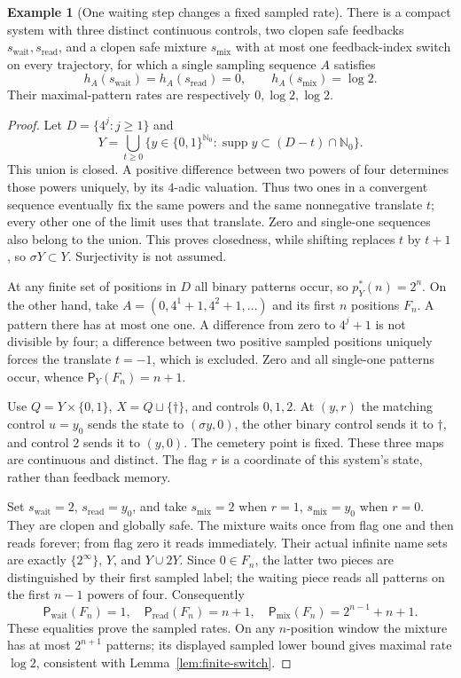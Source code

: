 \documentclass[11pt,reqno]{amsart}
\numberwithin{equation}{section}
\theoremstyle{definition}
\newtheorem{example}[theorem]{Example}
\theoremstyle{definition}
\newcommand{\Nzero}{\mathbb N_0}
\newcommand{\Patt}{\mathsf P}
\newcommand{\supp}{\operatorname{supp}}
\begin{document}
\begin{example}[One waiting step changes a fixed sampled rate]
\label{ex:one-wait}
There is a compact system with three distinct continuous controls,
two clopen safe feedbacks $s_{\mathrm{wait}},s_{\mathrm{read}}$, and a
clopen safe mixture $s_{\mathrm{mix}}$ with at most one feedback-index
switch on every trajectory, for which a single sampling sequence
$A$ satisfies
\[
 h_A(s_{\mathrm{wait}})=h_A(s_{\mathrm{read}})=0,
 \qquad h_A(s_{\mathrm{mix}})=\log2.
\]
Their maximal-pattern rates are respectively $0,\log2,\log2$.
\end{example}
\begin{proof}
Let $D=\{4^j:j\ge1\}$ and
\[
 Y=\bigcup_{t\ge0}
 \{y\in\{0,1\}^{\Nzero}:\supp y\subset(D-t)\cap\Nzero\}.
\]
This union is closed. A positive difference between two powers
of four determines those powers uniquely, by its $4$-adic
valuation. Thus two ones in a convergent sequence eventually
fix the same powers and the same nonnegative translate $t$;
every other one of the limit uses that translate. Zero and
single-one sequences also belong to the union. This proves
closedness, while shifting replaces $t$ by $t+1$, so
$\sigma Y\subset Y$. Surjectivity is not assumed.

At any finite set of positions in $D$ all binary patterns occur,
so $p_Y^*(n)=2^n$. On the other hand, take
$A=(0,4^1+1,4^2+1,\ldots)$ and its first $n$ positions $F_n$.
A pattern there has at most one one. A difference from zero
to $4^j+1$ is not divisible by four; a difference between two
positive sampled positions uniquely forces the translate
$t=-1$, which is excluded. Zero and all single-one patterns
occur, whence $\Patt_Y(F_n)=n+1$.

Use $Q=Y\times\{0,1\}$, $X=Q\sqcup\{\dagger\}$, and
controls $0,1,2$. At $(y,r)$ the matching control $u=y_0$
sends the state to $(\sigma y,0)$, the other binary control
sends it to $\dagger$, and control $2$ sends it to $(y,0)$.
The cemetery point is fixed. These three maps are continuous
and distinct. The flag $r$ is a coordinate of this system's
state, rather than feedback memory.

Set $s_{\mathrm{wait}}=2$, $s_{\mathrm{read}}=y_0$, and take
$s_{\mathrm{mix}}=2$ when $r=1$, $s_{\mathrm{mix}}=y_0$ when $r=0$.
They are clopen and globally safe. The mixture waits once
from flag one and then reads forever; from flag zero it reads
immediately. Their actual infinite name sets are exactly
$\{2^\infty\}$, $Y$, and $Y\cup2Y$. Since $0\in F_n$,
the latter two pieces are distinguished by their first sampled
label; the waiting piece reads all patterns on the first
$n-1$ powers of four. Consequently
\[
 \Patt_{\mathrm{wait}}(F_n)=1,\quad
 \Patt_{\mathrm{read}}(F_n)=n+1,\quad
 \Patt_{\mathrm{mix}}(F_n)=2^{n-1}+n+1.
\]
These equalities prove the sampled rates. On any $n$-position
window the mixture has at most $2^{n+1}$ patterns; its displayed
sampled lower bound gives maximal rate $\log2$, consistent
with Lemma~\ref{lem:finite-switch}.
\end{proof}
\end{document}

